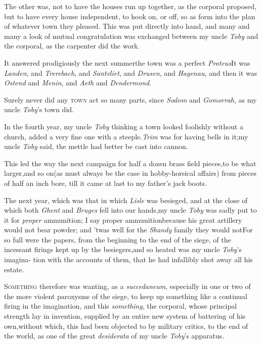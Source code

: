 \documentclass{article}
\begin{document}
The other was, not to have the houses run up together, as the
corporal proposed, but to have every house independent, to hook on,
or off, so as form into the plan of whatever town they pleased.
This was put directly into hand, and many and many a look of mutual
congratulation was exchanged between my uncle \textit{Toby} and the
corporal, as the carpenter did the work.

\tsh It answered prodigiously the next
summer\tsh the town was a perfect
\textit{Proteus}\tsh It was \textit{Landen}, and
\textit{Trerebach}, and \textit{Santvliet}, and \textit{Drusen}, and
\textit{Hagenau},\break
\tsk and then it was \textit{Ostend} and
\textit{Menin}, and \textit{Aeth} and \textit{Dendermond}.\tsh

\tsh Surely never did any \textsc{town} act so
many parts, since \textit{Sodom} and \textit{Gomorrah}, as my uncle
\textit{Toby}’s town did.

In the fourth year, my uncle \textit{Toby} thinking a town looked
foolishly without a church, added a very fine one with a
steeple.\tsh \textit{Trim} was for having bells in
it;\tsh my uncle \textit{Toby} said, the\break
mettle had better be cast into cannon.

This led the way the next campaign for half a dozen brass
field pieces,\tsk to be 
what larger,\tsk and so
on\tsk (as must always be the case in hobby-horsical affairs)
from pieces of half an inch bore, till it came at last to my
father’s jack boots.

The next year, which was that in which \textit{Lisle} was
besieged, and at the close of which both \textit{Ghent} and
\textit{Bruges} fell into our hands,\tsk my uncle \textit{Toby} was
sadly put to it for \textit{proper} ammunition;\break
\tsh I say proper ammunition\tsh because his great artillery
would not bear powder; and ’twas well for the \textit{Shandy}
family they would not\tsh For so full were the papers, from the
beginning to the end of the siege, of the incessant firings kept
up by the besiegers,\tsh and so heated was my uncle
\textit{Toby}’s imagina- tion with the accounts of them, that he
had infallibly shot away all his estate.

\textsc{Something} therefore was wanting, as a
\textit{succedaneum}, especially in one or two of the more violent
paroxysms of the siege, to keep up something like a continual
firing in the imagination,\tsh\break
and this \textit{something}, the corporal, whose principal
strength lay in invention, supplied by an entire new system of
battering of his own,\tsk without which, this had been objected
to by military critics, to the end of the world, as one of the
great \textit{desiderata} of my uncle \textit{Toby}’s apparatus.
\end{document}
